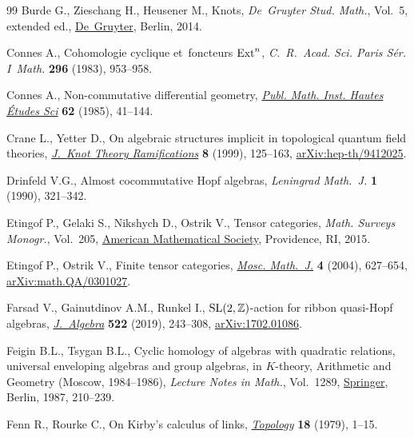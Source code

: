 \documentclass[pdftex]{sigma}
\numberwithin{equation}{section}
\begin{document}
\begin{thebibliography}{99}
Burde G., Zieschang H., Heusener M., Knots, \textit{De~Gruyter Stud. Math.},
 Vol.~5, {e}xtended ed.,
 \href{https://doi.org/10.1515/9783110270785}{De~Gruyter}, Berlin, 2014.

Connes A., Cohomologie cyclique et~foncteurs {${\rm Ext}^n$},
 \textit{C.~R.~Acad. Sci. Paris S\'er. I~Math.} \textbf{296} (1983), 953--958.

Connes A., Non-commutative differential geometry,
 \href{https://doi.org/10.1007/BF02698807}{\textit{Publ. Math. Inst. Hautes
 \'Etudes Sci}} \textbf{62} (1985), 41--144.

Crane L., Yetter D., On algebraic structures implicit in topological quantum
 field theories,
 \href{https://doi.org/10.1142/S0218216599000109}{\textit{J.~Knot Theory
 Ramifications}} \textbf{8} (1999), 125--163,
 \href{http://arxiv.org/abs/hep-th/9412025}{arXiv:hep-th/9412025}.

Drinfeld V.G., Almost cocommutative {H}opf algebras, \textit{Leningrad
 Math.~J.} \textbf{1} (1990), 321--342.

Etingof P., Gelaki S., Nikshych D., Ostrik V., Tensor categories, \textit{Math.
 Surveys Monogr.}, Vol.~205, \href{https://doi.org/10.1090/surv/205}{American
 Mathematical Society}, Providence, RI, 2015.

Etingof P., Ostrik V., Finite tensor categories,
 \href{https://doi.org/10.17323/1609-4514-2004-4-3-627-654}{\textit{Mosc.
 Math.~J.}} \textbf{4} (2004), 627--654,
 \href{http://arxiv.org/abs/math.QA/0301027}{arXiv:math.QA/0301027}.

Farsad V., Gainutdinov A.M., Runkel I., {${\rm SL}(2,\mathbb{Z})$}-action for
 ribbon quasi-{H}opf algebras,
 \href{https://doi.org/10.1016/j.jalgebra.2018.12.012}{\textit{J.~Algebra}}
 \textbf{522} (2019), 243--308,
 \href{http://arxiv.org/abs/1702.01086}{arXiv:1702.01086}.

Feigin B.L., Tsygan B.L., Cyclic homology of algebras with quadratic relations,
 universal enveloping algebras and group algebras, in {$K$}-theory, Arithmetic
 and Geometry ({M}oscow, 1984--1986), \textit{Lecture Notes in Math.}, Vol.~1289, \href{https://doi.org/10.1007/BFb0078369}{Springer}, Berlin, 1987,
 210--239.

Fenn R., Rourke C., On {K}irby's calculus of links,
 \href{https://doi.org/10.1016/0040-9383(79)90010-7}{\textit{Topology}}
 \textbf{18} (1979), 1--15.


\end{thebibliography}
\end{document}
